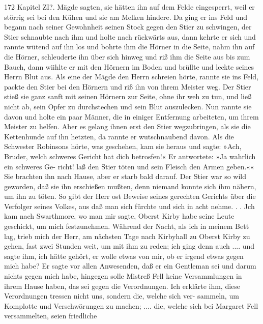 172 Kapitel ZI?.
Mägde sagten, sie hätten ihn auf dem Felde eingesperrt, weil er
störrig sei bei den Kühen und sie am Melken hindere. Da ging
er ins Feld und begann nach seiner Gewohnheit seinen Stock gegen
den Stier zu schwingen, der Stier schnaubte nach ihm und holte
nach rückwärts aus, dann kehrte er sich und rannte wütend auf
ihn los und bohrte ihm die Hörner in die Seite, nahm ihn auf
die Hörner, schleuderte ihn über sich hinweg und riß ihm die Seite
aus bis zum Bauch, dann wiihlte er mit den Hörnern im Boden
und brüllte und leckte seines Herrn Blut aus. Als eine der
Mägde den Herrn schreien hörte, rannte sie ins Feld, packte den
Stier bei den Hörnern und riß ihn von ihrem Meister weg.
Der Stier stieß sie ganz sanft mit seinen Hörnern zur Seite, ohne
ihr weh zu tun, und ließ nicht ab, sein Opfer zu durchstechen und
sein Blut auszulecken. Nun rannte sie davon und holte ein paar
Männer, die in einiger Entfernung arbeiteten, um ihrem Meister
zu helfen. Aber es gelang ihnen erst den Stier wegzubringen, als
sie die Kettenhunde auf ihn hetzten, da rannte er wutschnaubend
davon. Als die Schwester Robinsons hörte, was geschehen, kam
sie heraus und sagte: »Ach, Bruder, welch schweres Gericht hat
dich betrosfen!« Er antwortete: »Ja wahrlich ein schweres Ge-
richt! laß den Stier töten und sein Fleisch den Armen geben.««
Sie brachten ihn nach Hause, aber er starb bald darauf. Der
Stier war so wild geworden, daß sie ihn erschießen mußten, denn
niemand konnte sich ihm nähern, um ihn zu töten. So gibt der
Herr ost Beweise seines gerechten Gerichts über die Verfolger
seines Volkes, aus daß man sich fürchte und sich in acht nehme. . .
Jch kam nach Swarthmore, wo man mir sagte, Oberst Kirby
habe seine Leute geschickt, um mich festzunehmen. Während der
Nacht, als ich in meinem Bett lag, trieb mich der Herr, am
nächsten Tage nach Kirbyhall zu Oberst Kirby zu gehen, fast zwei
Stunden weit, um mit ihm zu reden; ich ging denn auch ....
und sagte ihm, ich hätte gehört, er wolle etwas von mir, ob er
irgend etwas gegen mich habe? Er sagte vor allen Anwesenden,
daß er ein Gentleman sei und darum nichts gegen mich habe,
hingegen solle Mistreß Fell keine Versammlungen in ihrem Hause
haben, das sei gegen die Verordnungen. Ich erklärte ihm, diese
Verordnungen tressen nicht uns, sondern die, welche sich ver-
sammeln, um Komplotte und Verschwörungen zu machen; ....
die, welche sich bei Margaret Fell versammelten, seien friedliche


